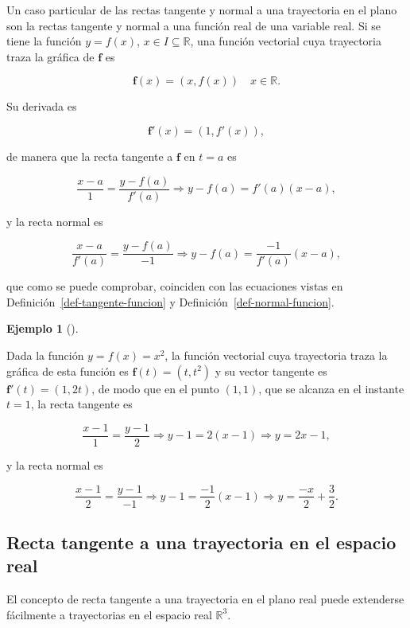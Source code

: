 \documentclass[
  a4paper,
]{scrreport}
\theoremstyle{definition}
\newtheorem{example}{Ejemplo}[chapter]
\theoremstyle{plain}
\theoremstyle{definition}
\theoremstyle{definition}
\theoremstyle{plain}
\theoremstyle{plain}
\theoremstyle{remark}
\begin{document}
Un caso particular de las rectas tangente y normal a una trayectoria en
el plano son la rectas tangente y normal a una función real de una
variable real. Si se tiene la función \(y=f(x)\),
\(x\in I\subseteq \mathbb{R}\), una función vectorial cuya trayectoria
traza la gráfica de \(\mathbf{f}\) es

\[
\mathbf{f}(x) = (x,f(x))  \quad x\in \mathbb{R}.
\]

Su derivada es

\[
\mathbf{f}'(x) = (1,f'(x)),
\]

de manera que la recta tangente a \(\mathbf{f}\) en \(t=a\) es

\[
\frac{x-a}{1} = \frac{y-f(a)}{f'(a)} \Rightarrow y-f(a) = f'(a)(x-a),
\]

y la recta normal es

\[
\frac{x-a}{f'(a)} = \frac{y-f(a)}{-1} \Rightarrow y-f(a) = \frac{-1}{f'(a)}(x-a),
\]

que como se puede comprobar, coinciden con las ecuaciones vistas en
Definición~\ref{def-tangente-funcion} y
Definición~\ref{def-normal-funcion}.

\begin{example}[]\protect\hypertarget{exm-tangente-normal-funcion}{}\label{exm-tangente-normal-funcion}

Dada la función \(y=f(x)=x^2\), la función vectorial cuya trayectoria
traza la gráfica de esta función es \(\mathbf{f}(t)=(t,t^2)\) y su
vector tangente es \(\mathbf{f}'(t)=(1,2t)\), de modo que en el punto
\((1,1)\), que se alcanza en el instante \(t=1\), la recta tangente es

\[
\frac{x-1}{1} = \frac{y-1}{2} \Rightarrow y-1 = 2(x-1) \Rightarrow y = 2x-1,
\]

y la recta normal es

\[
\frac{x-1}{2} = \frac{y-1}{-1} \Rightarrow y-1 = \frac{-1}{2}(x-1) \Rightarrow y = \frac{-x}{2}+\frac{3}{2}.
\]

\end{example}

\subsection{Recta tangente a una trayectoria en el espacio
real}\label{recta-tangente-a-una-trayectoria-en-el-espacio-real}

El concepto de recta tangente a una trayectoria en el plano real puede
extenderse fácilmente a trayectorias en el espacio real
\(\mathbb{R}^3\).
\end{document}
